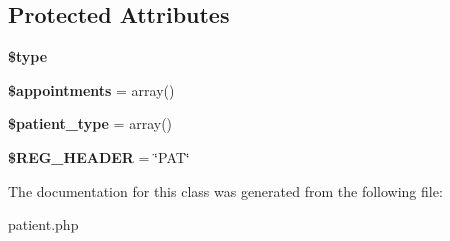 \subsection*{Protected Attributes}
\begin{DoxyCompactItemize}
\item 
\hypertarget{classPatient_a0f1165c1a2095003e1c78adf67e47aeb}{{\bfseries \$type}}\label{classPatient_a0f1165c1a2095003e1c78adf67e47aeb}

\item 
\hypertarget{classPatient_a91c6b74d6af3e94b5ae9927ffc5f184a}{{\bfseries \$appointments} = array()}\label{classPatient_a91c6b74d6af3e94b5ae9927ffc5f184a}

\item 
\hypertarget{classPatient_a97e8762eab9eb793c8161eeaed903f9c}{{\bfseries \$patient\-\_\-type} = array()}\label{classPatient_a97e8762eab9eb793c8161eeaed903f9c}

\item 
\hypertarget{classPatient_af0f5929845f2e55d4f726117a8d34ea5}{{\bfseries \$\-R\-E\-G\-\_\-\-H\-E\-A\-D\-E\-R} = \char`\"{}P\-A\-T\char`\"{}}\label{classPatient_af0f5929845f2e55d4f726117a8d34ea5}

\end{DoxyCompactItemize}


The documentation for this class was generated from the following file\-:\begin{DoxyCompactItemize}
\item 
patient.\-php\end{DoxyCompactItemize}

